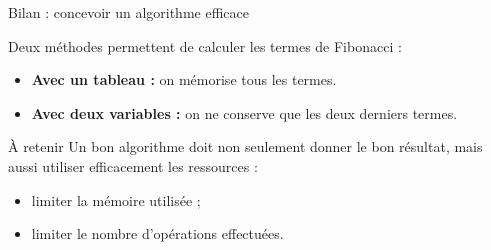 \documentclass[10pt]{beamer}
\begin{document}
\begin{frame}{Bilan : concevoir un algorithme efficace}

Deux méthodes permettent de calculer les termes de Fibonacci :

\begin{itemize}
    \item \textbf{Avec un tableau :} on mémorise tous les termes.
    \item \textbf{Avec deux variables :} on ne conserve que les deux
    derniers termes.
\end{itemize}

\pause

\begin{alertblock}{À retenir}
Un bon algorithme doit non seulement donner le bon résultat,
mais aussi utiliser efficacement les ressources :
\begin{itemize}
    \item limiter la mémoire utilisée ;
    \item limiter le nombre d'opérations effectuées.
\end{itemize}
\end{alertblock}

\end{frame}
\end{document}
